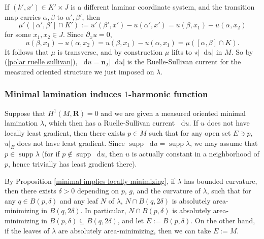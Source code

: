 \documentclass[reqno,11pt]{amsart}
\newcommand{\RR}{\mathbf{R}}
\newcommand*\dif{\mathop{}\!\mathrm{d}}
\DeclareMathOperator{\supp}{supp}
\newcommand{\normal}{\mathbf n}
\theoremstyle{definition}
\numberwithin{equation}{section}
\begin{document}
If $(k', x') \in K' \times J$ is a different laminar coordinate system, and the transition map carries $\alpha, \beta$ to $\alpha', \beta'$, then
$$\mu'([\alpha', \beta'] \cap K') := u'(\beta', x') - u(\alpha', x') = u(\beta, x_1) - u(\alpha, x_2)$$
for some $x_1, x_2 \in J$. Since $\partial_x u = 0$,
$$u(\beta, x_1) - u(\alpha, x_2) = u(\beta, x_1) - u(\alpha, x_1) = \mu([\alpha, \beta] \cap K).$$
It follows that $\mu$ is transverse, and by construction $\mu$ lifts to $\star |\dif u|$ in $M$.
So by (\ref{polar ruelle sullivan}), $\dif u = \normal_\lambda |\dif u|$ is the Ruelle-Sullivan current for the measured oriented structure we just imposed on $\lambda$.


\subsubsection{Minimal lamination induces \texorpdfstring{$1$-harmonic}{one-harmonic} function}
Suppose that $H^1(M, \RR) = 0$ and we are given a measured oriented minimal lamination $\lambda$, which then has a Ruelle-Sullivan current $\dif u$.
If $u$ does not have locally least gradient, then there exists $p \in M$ such that for any open set $E \ni p$, $u|_E$ does not have least gradient.
Since $\supp \dif u = \supp \lambda$, we may assume that $p \in \supp \lambda$ (for if $p \notin \supp \dif u$, then $u$ is actually constant in a neighborhood of $p$, hence trivially has least gradient there).

By Proposition \ref{minimal implies locally minimizing}, if $\lambda$ has bounded curvature, then there exists $\delta > 0$ depending on $p$, $g$, and the curvature of $\lambda$, such that for any $q \in B(p, \delta)$ and any leaf $N$ of $\lambda$, $N \cap B(q, 2\delta)$ is absolutely area-minimizing in $B(q, 2\delta)$.
In particular, $N \cap B(p, \delta)$ is absolutely area-minimizing in $B(p, \delta) \subseteq B(q, 2\delta)$, and let $E := B(p, \delta)$.
On the other hand, if the leaves of $\lambda$ are absolutely area-minimizing, then we can take $E := M$.
\end{document}

